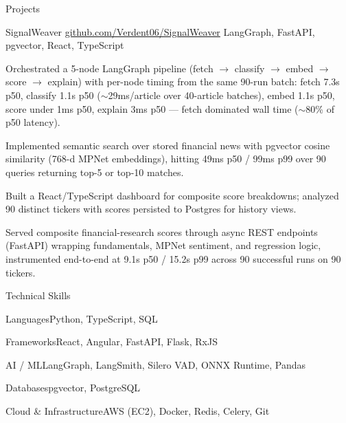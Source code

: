 \documentclass[
	11pt
]{../../../template}
\begin{document}
	\begin{rSection}{P}{rojects}
		\begin{rSectionEntry}
			{SignalWeaver}
			{\href{https://github.com/Verdent06/SignalWeaver}{github.com/Verdent06/SignalWeaver}}
			{}
			{LangGraph, FastAPI, pgvector, React, TypeScript}
			{}

			\item Orchestrated a 5-node LangGraph pipeline (fetch $\rightarrow$ classify $\rightarrow$ embed $\rightarrow$ score $\rightarrow$ explain) with per-node timing from the same 90-run batch: fetch 7.3s p50, classify 1.1s p50 ($\sim$29ms/article over 40-article batches), embed 1.1s p50, score under 1ms p50, explain 3ms p50 --- fetch dominated wall time ($\sim$80\% of p50 latency).
			\item Implemented semantic search over stored financial news with pgvector cosine similarity (768-d MPNet embeddings), hitting 49ms p50 / 99ms p99 over 90 queries returning top-5 or top-10 matches.
			\item Built a React/TypeScript dashboard for composite score breakdowns; analyzed 90 distinct tickers with scores persisted to Postgres for history views.
			\item Served composite financial-research scores through async REST endpoints (FastAPI) wrapping fundamentals, MPNet sentiment, and regression logic, instrumented end-to-end at 9.1s p50 / 15.2s p99 across 90 successful runs on 90 tickers.
		\end{rSectionEntry}
	\end{rSection}

	\begin{rSection}{T}{echnical Skills}
		\begin{rSet}{Languages}{Python, TypeScript, SQL}
		\end{rSet}
		\begin{rSet}{Frameworks}{React, Angular, FastAPI, Flask, RxJS}
		\end{rSet}
		\begin{rSet}{AI / ML}{LangGraph, LangSmith, Silero VAD, ONNX Runtime, Pandas}
		\end{rSet}
		\begin{rSet}{Databases}{pgvector, PostgreSQL}
		\end{rSet}
		\begin{rSet}{Cloud \& Infrastructure}{AWS (EC2), Docker, Redis, Celery, Git}
		\end{rSet}
	\end{rSection}
\end{document}
